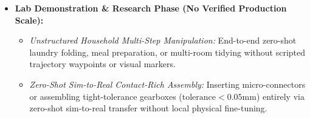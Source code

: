 \documentclass[11pt,a4paper]{article}
\begin{document}
\begin{itemize}
    \item \textbf{Lab Demonstration \& Research Phase (No Verified Production Scale):}
    \begin{itemize}
        \item \textit{Unstructured Household Multi-Step Manipulation:} End-to-end zero-shot laundry folding, meal preparation, or multi-room tidying without scripted trajectory waypoints or visual markers.
        \item \textit{Zero-Shot Sim-to-Real Contact-Rich Assembly:} Inserting micro-connectors or assembling tight-tolerance gearboxes ($\text{tolerance} < 0.05\text{mm}$) entirely via zero-shot sim-to-real transfer without local physical fine-tuning.
    \end{itemize}
\end{itemize}
\end{document}
